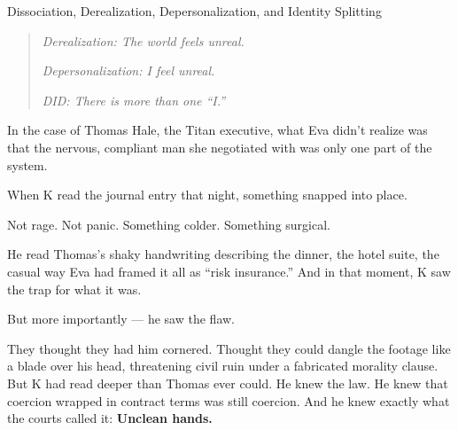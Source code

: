 \begin{PsychologicalSidebar}{Dissociation, Derealization, Depersonalization, and Identity Splitting}
    \medskip
    
    \begin{quote}
    \textit{Derealization: The world feels unreal.}
    
    \textit{Depersonalization: I feel unreal.}
    
    \textit{DID: There is more than one “I.”}
    \end{quote}
    
    In the case of Thomas Hale, the Titan executive, what Eva didn’t realize was that the nervous, compliant man she negotiated with was only one part of the system.
    
\end{PsychologicalSidebar}

\medskip

When K read the journal entry that night, something snapped into place.

Not rage. Not panic.
Something colder.
Something surgical.

He read Thomas’s shaky handwriting describing the dinner, the hotel suite, the casual way Eva had framed it all as “risk insurance.”
And in that moment, K saw the trap for what it was.

But more importantly —
he saw the flaw.

They thought they had him cornered.
Thought they could dangle the footage like a blade over his head, threatening civil ruin under a fabricated morality clause.
But K had read deeper than Thomas ever could.
He knew the law.
He knew that coercion wrapped in contract terms was still coercion.
And he knew exactly what the courts called it: \textbf{Unclean hands.}

